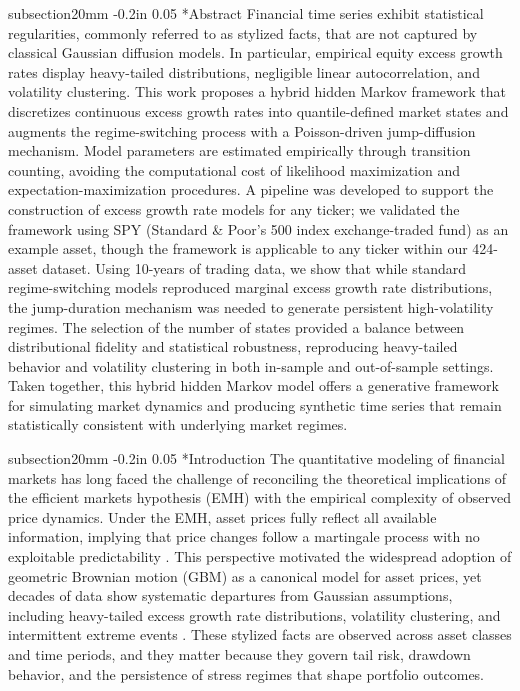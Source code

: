 \documentclass[12pt, letterpaper]{article}
\makeatletter
\renewcommand\section{\@startsection
	{subsection}{2}{0mm}
	{-0.2in}
	{0.05\baselineskip}
	{\normalfont\large\bfseries}}
\makeatother
\begin{document}
\section*{Abstract}
\noindent Financial time series exhibit statistical regularities, commonly referred to as stylized facts, that are not captured by classical Gaussian diffusion models. In particular, empirical equity excess growth rates display heavy-tailed distributions, negligible linear autocorrelation, and volatility clustering. This work proposes a hybrid hidden Markov framework that discretizes continuous excess growth rates into quantile-defined market states and augments the regime-switching process with a Poisson-driven jump-diffusion mechanism. Model parameters are estimated empirically through transition counting, avoiding the computational cost of likelihood maximization and expectation-maximization procedures. A pipeline was developed to support the construction of excess growth rate models for any ticker; we validated the framework using SPY (Standard \& Poor's 500 index exchange-traded fund) as an example asset, though the framework is applicable to any ticker within our 424-asset dataset. Using 10-years of trading data, we show that while standard regime-switching models reproduced marginal excess growth rate distributions, the jump-duration mechanism was needed to generate persistent high-volatility regimes. The selection of the number of states provided a balance between distributional fidelity and statistical robustness, reproducing heavy-tailed behavior and volatility clustering in both in-sample and out-of-sample settings.
Taken together, this hybrid hidden Markov model offers a generative framework for simulating market dynamics and producing synthetic time series that remain statistically consistent with underlying market regimes.


\clearpage

\section*{Introduction}\label{sec:intro}
The quantitative modeling of financial markets has long faced the challenge of reconciling the theoretical implications of the efficient markets hypothesis (EMH) with the empirical complexity of observed price dynamics. Under the EMH, asset prices fully reflect all available information, implying that price changes follow a martingale process with no exploitable predictability \cite{fama_efficient_1970}. This perspective motivated the widespread adoption of geometric Brownian motion (GBM) as a canonical model for asset prices, yet decades of data show systematic departures from Gaussian assumptions, including heavy-tailed excess growth rate distributions, volatility clustering, and intermittent extreme events \cite{mandelbrot_variation_1963, cont_empirical_2001}. These stylized facts are observed across asset classes and time periods, and they matter because they govern tail risk, drawdown behavior, and the persistence of stress regimes that shape portfolio outcomes.
\end{document}
